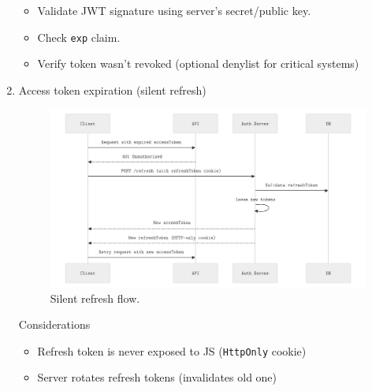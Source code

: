 \documentclass[a4paper,10pt]{article}
\begin{document}
\begin{enumerate}
          \begin{itemize}
              \item Validate JWT signature using server's secret/public key.
              \item Check \texttt{exp} claim.
              \item Verify token wasn't revoked (optional denylist for critical systems)
          \end{itemize}
    \item Access token expiration (silent refresh)
          \begin{figure}[H]
              \centering
              \includegraphics[width=\textwidth]{images/silent-refresh.png}
              \caption{Silent refresh flow.}
              \label{fig:silent refresh}
          \end{figure}

          Considerations

          \begin{itemize}
              \item Refresh token is never exposed to JS (\texttt{HttpOnly} cookie)

              \item Server rotates refresh tokens (invalidates old one)


\end{itemize}
\end{enumerate}
\end{document}
